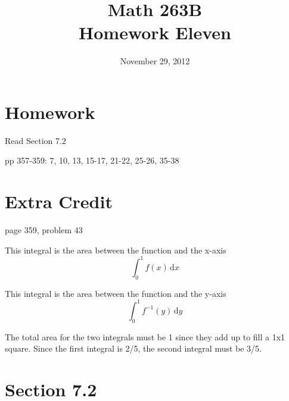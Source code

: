 \documentclass{exam}
\title{Math 263B \\ Homework Eleven}
\date{November 29, 2012}
\begin{document}
\maketitle

\section{Homework}

\begin{itemize*}
  \item Read Section 7.2
  \item pp 357-359: 7, 10, 13, 15-17, 21-22, 25-26, 35-38
\end{itemize*}


\section{Extra Credit}
page 359, problem 43
\ifprintanswers
\begin{solution}
This integral is the area between the function and the x-axis
\[
  \int_0^1 f(x) \, \mathrm{d}x
\]

This integral is the area between the function and the y-axis
\[
  \int_0^1 f^{-1}(y) \, \mathrm{d}y
\]

The total area for the two integrals must be 1 since they add up to fill a 1x1 square.  Since the first integral is 2/5,
the second integral must be 3/5. 

\end{solution}

\section{Section 7.2}
\end{document}
